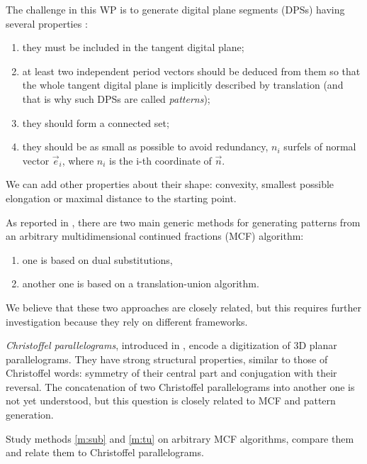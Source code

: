 The challenge in this WP is to generate digital plane segments (DPSs)
having several properties \cite{Jamet2016}:
\begin{enumerate}[label=(P\arabic*)]
\item they must be included in the tangent digital plane; \label{prop:inside}
\item at least two independent period vectors should be deduced from them
  so that the whole tangent digital plane is implicitly described by translation
  (and that is why such DPSs are called \emph{patterns}); \label{prop:period}
\item they should form a connected set; \label{prop:connect}
\item they should be as small as possible to avoid redundancy,
  \eg $n_i$ surfels of normal vector $\vec{e}_i$, where $n_i$ is the i-th coordinate
  of $\vec{n}$. \label{prop:small}
\end{enumerate}
We can add other properties about their shape: 
convexity, smallest possible elongation or maximal distance to the starting point.

As reported in , there are two main generic methods for generating patterns
from an arbitrary multidimensional continued fractions (MCF) algorithm:
\begin{enumerate}[label=(M\arabic*)]
\item one is based on dual substitutions, \label{m:sub}
\item another one is based on a translation-union algorithm. \label{m:tu}
\end{enumerate}
We believe that these two approaches are closely related, but this requires
further investigation because they rely on different frameworks. 

\emph{Christoffel parallelograms}, introduced in \cite{Labbe2015},
encode a digitization of 3D planar parallelograms. They have strong
structural properties, similar to those of Christoffel words:
symmetry of their central part and conjugation with their reversal.
The concatenation of two Christoffel parallelograms into another one
is not yet understood, but this question is closely related to MCF
and pattern generation. 

\begin{Task}
  \label{task:genmeth}
  Study methods \ref{m:sub} and \ref{m:tu} on arbitrary MCF algorithms,
  compare them and relate them to Christoffel parallelograms.   
\end{Task}

